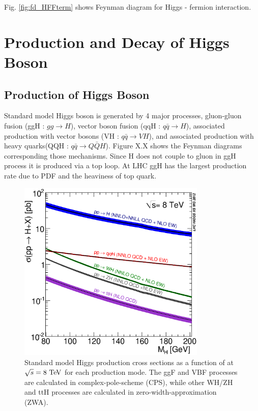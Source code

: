 Fig. \ref{fig:fd_HFFterm} shows Feynman diagram for Higgs - fermion interaction.    





\newpage
\section{Production and Decay of Higgs Boson}

\subsection{Production of Higgs Boson}
Standard model Higgs boson is generated by 4 major processes, 
gluon-gluon fusion (ggH : $gg \rightarrow H$), 
vector boson fusion (qqH : $q\bar{q}\rightarrow H$),
associated production with vector bosons (VH : $q\bar{q}\rightarrow VH$), and 
associated production with heavy quarks(QQH : $q\bar{q}\rightarrow Q\bar{Q}H$). 
Figure X.X shows the Feynman diagrams corresponding those mechanisms.
Since H does not couple to gluon in ggH process it is produced via a top loop.
At LHC ggH has the largest production rate due to PDF and 
the heaviness of top quark. 
\begin{figure}[t]
\centering
\includegraphics[width=0.8\textwidth]{figures/Higgs_XS_8TeV_LM200.eps}
\caption{ Standard model Higgs production cross sections 
as a function of \mHi{} at $\sqrt{s}=8~\mathrm{Te\kern -0.1em V}$ for each 
production mode. %
The ggF and VBF processes are 
calculated in complex-pole-scheme (CPS), while other WH/ZH and ttH processes 
are calculated in zero-width-approximation (ZWA). }
\label{fig:Higgs_XS_8TeV_LM200}
\end{figure}

